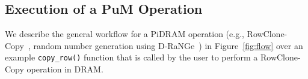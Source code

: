
\subsection{Execution of a PuM Operation}
\label{sec:execution-overview}

{We describe the general workflow for a PiDRAM operation (e.g., RowClone-Copy~\cite{seshadri2013rowclone}, random number generation using D-RaNGe~\cite{kim.hpca19}) in Figure~\ref{fig:flow} over an example \texttt{{copy\_row()}} function that is called by the user to {perform a RowClone-Copy operation} in DRAM.}


